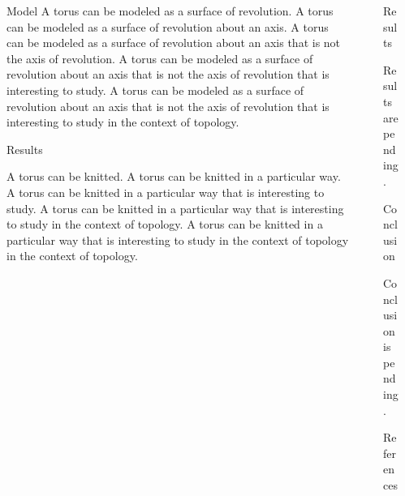\documentclass{beamer}
\newlength{\sepwidth}
\newlength{\colwidth}
\newcommand{\separatorcolumn}{\begin{column}{\sepwidth}\end{column}}
\begin{document}
\begin{frame}[t]
\begin{columns}[t]
\begin{column}{\colwidth}
\begin{block}{Model}
A torus can be modeled as a surface of revolution. A torus can be modeled as a surface of revolution about an axis. A torus can be modeled as a surface of revolution about an axis that is not the axis of revolution. A torus can be modeled as a surface of revolution about an axis that is not the axis of revolution that is interesting to study. A torus can be modeled as a surface of revolution about an axis that is not the axis of revolution that is interesting to study in the context of topology.

\end{block}

\begin{block}{Results}

A torus can be knitted. A torus can be knitted in a particular way. A torus can be knitted in a particular way that is interesting to study. A torus can be knitted in a particular way that is interesting to study in the context of topology. A torus can be knitted in a particular way that is interesting to study in the context of topology in the context of topology.

\end{block}

\end{column}
\separatorcolumn%


\begin{column}{\colwidth}

\begin{block}{Results}

Results are pending.

\end{block}

\begin{block}{Conclusion}

Conclusion is pending.

\end{block}

\begin{block}{References}
\end{block}

\end{column}
\separatorcolumn%

\end{columns}
\end{frame}
\end{document}
